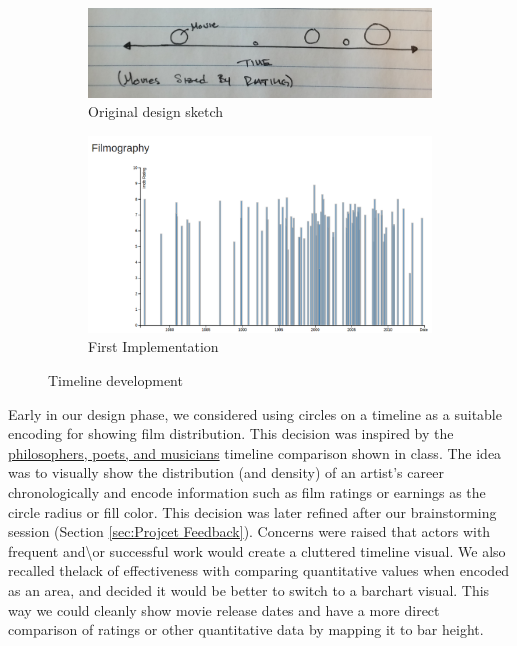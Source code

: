 \documentclass[12pt]{article}
\begin{document}
	\begin{figure}[h!]
			\centering
			\begin{subfigure}[t]{.5\textwidth}
			  \centering
			  \includegraphics[width=\linewidth]{images/timeline_orig.png}
			  \caption{Original design sketch}
			  \label{fig:timelineA}
			\end{subfigure}%
			\begin{subfigure}[t]{.5\textwidth}
			  \centering
			  \includegraphics[width=.7\linewidth]{images/timeline_crop_waits.png}
			  \caption{First Implementation}
			  \label{fig:timelineB}
			\end{subfigure}%
			\caption{Timeline development}
			\label{fig:timeline}
		\end{figure}
		
Early in our design phase, we considered using circles on a timeline as a suitable encoding for showing film distribution.  This decision was inspired by the \href{http://mariandoerk.de/edgemaps/demo/#phils;time;;;}{philosophers, poets, and musicians} timeline comparison shown in class. The idea was to visually show the distribution (and density) of an artist's career chronologically and encode information such as film ratings or earnings as the circle radius or fill color.   This decision was later refined after our brainstorming session (Section \ref{sec:Projcet Feedback}). Concerns were raised that actors with frequent and\textbackslash or successful work would create a cluttered timeline visual.  We also recalled thelack of effectiveness with comparing quantitative values when encoded as an area, and decided it would be better to switch to a barchart visual.  This way we could cleanly show movie release dates and have a more direct comparison of ratings or other quantitative data by mapping it to bar height.
\end{document}
